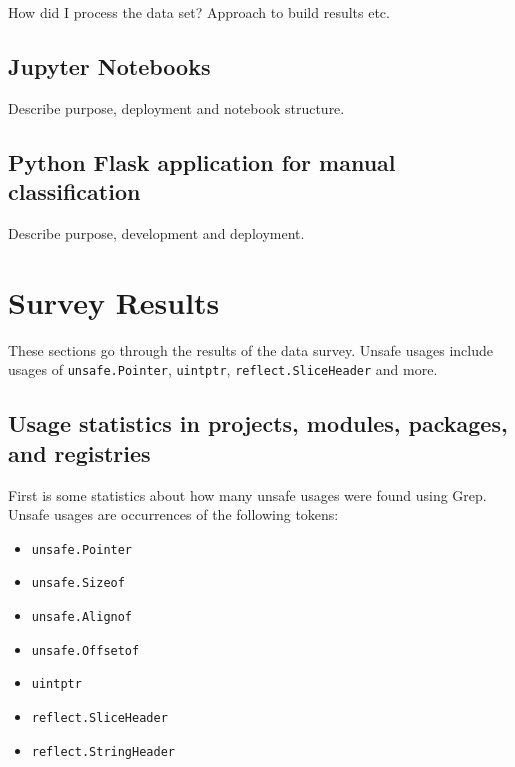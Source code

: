 How did I process the data set?
Approach to build results etc.



\subsection{Jupyter Notebooks}\label{subsec:survey-jupyter}

Describe purpose, deployment and notebook structure.



\subsection{Python Flask application for manual classification}\label{subsec:survey-classification}

Describe purpose, development and deployment.



\section{Survey Results}\label{sec:survey-results}

These sections go through the results of the data survey.
Unsafe usages include usages of \texttt{unsafe.Pointer}, \texttt{uintptr}, \texttt{reflect.SliceHeader} and more.



\subsection{Usage statistics in projects, modules, packages, and registries}\label{subsec:results-stats}

First is some statistics about how many unsafe usages were found using Grep.
Unsafe usages are occurrences of the following tokens:

\begin{itemize}
    \item \texttt{unsafe.Pointer}
    \item \texttt{unsafe.Sizeof}
    \item \texttt{unsafe.Alignof}
    \item \texttt{unsafe.Offsetof}
    \item \texttt{uintptr}
    \item \texttt{reflect.SliceHeader}
    \item \texttt{reflect.StringHeader}
\end{itemize}


